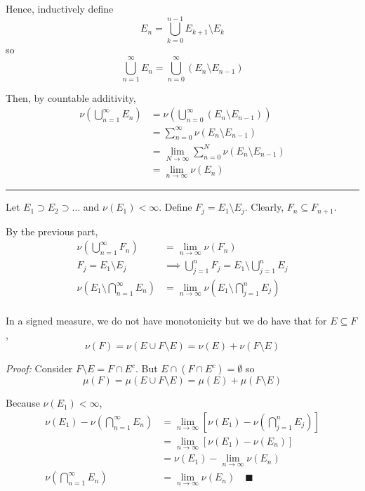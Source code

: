 \documentclass[12pt]{article}
\newcommand{\qed}{\quad \blacksquare}
\newcommand{\sub}{\subseteq}
\renewcommand{\div}{\vspace*{10pt}\hrule\vspace*{10pt}}
\newenvironment*{proof}[1][blue]{
\begin{tcolorbox}[
    parbox=false,
    colback=#1!5!white,
    colframe=#1!75!black,
    breakable
]}
{\end{tcolorbox}}
\begin{document}
        Hence, inductively define 
        \[E_n = \bigcup_{k=0}^{n-1} E_{k+1} \setminus E_k\]
        so 
        \[\bigcup_{n=1}^\infty E_n = \bigcup_{n=0}^\infty (E_n \setminus E_{n-1})\]

        Then, by countable additivity,
        \begin{align*}
            \nu\left(\bigcup_{n=1}^\infty E_n\right) &= \nu\left(\bigcup_{n=0}^\infty (E_n \setminus E_{n-1})\right)\\ 
            &= \sum_{n=0}^\infty \nu(E_n \setminus E_{n-1})\\ 
            &= \lim_{N\to\infty} \sum_{n=0}^N \nu(E_n \setminus E_{n-1})\\ 
            &= \lim_{n \to \infty} \nu(E_n)
        \end{align*}

        \div 

        Let $E_1 \supset E_2 \supset \dots$ and $\nu(E_1) < \infty$. Define $F_j = E_1 \setminus E_j$. Clearly, $F_n \sub F_{n+1}$. 

        By the previous part,
        \begin{align*}
            \nu\left(\bigcup_{n=1}^\infty F_n\right) &= \lim_{n \to \infty} \nu(F_n)\\ 
            F_j = E_1 \setminus E_j &\implies \bigcup_{j=1}^n F_j = E_1 \setminus \bigcup_{j=1}^n E_j\\ 
            \nu\left(E_1 \setminus \bigcap_{n=1}^\infty E_n\right) &= \lim_{n \to \infty} \nu(E_1 \setminus \bigcap_{j=1}^n E_j )\\
        \end{align*}

        In a signed measure, we do not have monotonicity but we do have that for $E \sub F$,
        \[\nu(F) = \nu(E \cup F \setminus E) = \nu(E) + \nu(F \setminus E)\]

        \begin{proof}
            \emph{Proof:} Consider $F \setminus E = F \cap E^c$. But $E \cap (F \cap E^c) = \emptyset$ so 
            \[\mu(F) = \mu(E \cup F \setminus E) = \mu(E) + \mu(F \setminus E)\]
        \end{proof}

        Because $\nu(E_1) < \infty$,
        \begin{align*}
            \nu(E_1) - \nu\left(\bigcap_{n=1}^\infty E_n\right) &= \lim_{n \to \infty} \left[\nu(E_1) - \nu\left(\bigcap_{j=1}^n E_j \right)\right]\\ 
                &= \lim_{n \to \infty} \left[\nu(E_1) - \nu(E_n)\right]\\ 
                &= \nu(E_1) - \lim_{n \to \infty} \nu(E_n)\\
            \nu\left(\bigcap_{n=1}^\infty E_n\right) &= \lim_{n \to \infty} \nu(E_n) \qed
        \end{align*}
\end{document}
